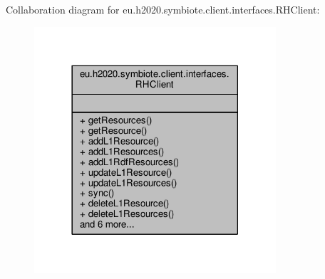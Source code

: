 Collaboration diagram for eu.\+h2020.\+symbiote.\+client.\+interfaces.\+R\+H\+Client\+:\nopagebreak
\begin{figure}[H]
\begin{center}
\leavevmode
\includegraphics[width=254pt]{interfaceeu_1_1h2020_1_1symbiote_1_1client_1_1interfaces_1_1RHClient__coll__graph}
\end{center}
\end{figure}
